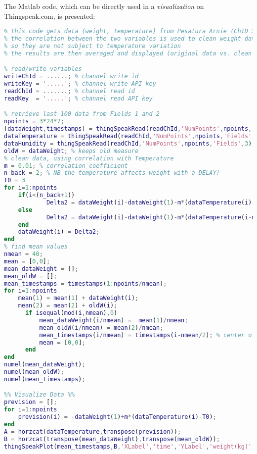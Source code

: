 The Matlab code, which can be directly used in a \textit{visualization} on Thingspeak.com, is presented:
\begin{lstlisting}[language=Matlab]
%%%%%%%%%%%%%%%%%%%%%%%
% this code gets data (weight, temperature) from Pesatura Arnie (ChID 350718)
% the correlation between the two variables is used to clean weight data
% so they are not subject to temperature variation
% the results are then averaged and displayed (original data vs. clean data) 

% read/write variables
writeChId = ......; % channel write id
writeKey = '.....'; % channel write API key
readChId = .......; % channel read id
readKey  = '.....'; % channel read API key

% retrieve last 100 data from Fields 1 and 2
npoints = 3*24*7;
[dataWeight,timestamps] = thingSpeakRead(readChId,'NumPoints',npoints,'Fields',1);%,'ReadKey',readKey);
dataTemperature = thingSpeakRead(readChId,'NumPoints',npoints,'Fields',2);%,'ReadKey',readKey);
dataHumidity = thingSpeakRead(readChId,'NumPoints',npoints,'Fields',3);
oldW = dataWeight; % keeps old measure
% clean data, using correlation with Temperature
m = 0.01; % correlation coefficient
n_back = 2; % NB the temperature affects weight with a DELAY!
T0 = 3 
for i=1:npoints
    if(i<(n_back+1))
            Delta2 = dataWeight(i)-dataWeight(1)-m*(dataTemperature(i)-T0);
    else
            Delta2 = dataWeight(i)-dataWeight(1)-m*(dataTemperature(i-n_back)-T0);
    end
    dataWeight(i) = Delta2;
end
% find mean values
nmean = 40;
mean = [0,0];
mean_dataWeight = [];
mean_oldW = [];
mean_timestamps = timestamps(1:npoints/nmean);
for i=1:npoints
    mean(1) = mean(1) + dataWeight(i);
    mean(2) = mean(2) + oldW(i);
      if isequal(mod(i,nmean),0)
          mean_dataWeight(i/nmean) =  mean(1)/nmean;
          mean_oldW(i/nmean) = mean(2)/nmean;
          mean_timestamps(i/nmean) = timestamps(i-nmean/2); % center of interval
          mean = [0,0];
      end       
end
numel(mean_dataWeight);
numel(mean_oldW);
numel(mean_timestamps);

%% Visualize Data %%
prevision = [];
for i=1:npoints
    prevision(i) = -dataWeight(1)+m*(dataTemperature(i)-T0);
end
A = horzcat(dataTemperature,transpose(prevision));
B = horzcat(transpose(mean_dataWeight),transpose(mean_oldW));
thingSpeakPlot(mean_timestamps,B,'XLabel','time','YLabel','weight(kg)','Title','weight with respect to original weight','Legend',{'corrected','measured'});
\end{lstlisting}
